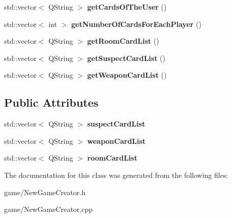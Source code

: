 \begin{DoxyCompactItemize}
\item 
\mbox{\label{classNewGameCreator_ac2905e16676010c2989674a8e18e2d9b}} 
std\+::vector$<$ Q\+String $>$ {\bfseries get\+Cards\+Of\+The\+User} ()
\item 
\mbox{\label{classNewGameCreator_a6bdc7ce36cc5c1bf2952ddd0167e6681}} 
std\+::vector$<$ int $>$ {\bfseries get\+Number\+Of\+Cards\+For\+Each\+Player} ()
\item 
\mbox{\label{classNewGameCreator_a10fb606e5d5132e63e3b81c8dc827486}} 
std\+::vector$<$ Q\+String $>$ {\bfseries get\+Room\+Card\+List} ()
\item 
\mbox{\label{classNewGameCreator_a94a0cfacc7bb3c7224de5df452528b4a}} 
std\+::vector$<$ Q\+String $>$ {\bfseries get\+Suspect\+Card\+List} ()
\item 
\mbox{\label{classNewGameCreator_ad5295b6deb4af47e067bf151654453ff}} 
std\+::vector$<$ Q\+String $>$ {\bfseries get\+Weapon\+Card\+List} ()
\end{DoxyCompactItemize}
\subsection*{Public Attributes}
\begin{DoxyCompactItemize}
\item 
\mbox{\label{classNewGameCreator_ab8658159eeea5d1a44e1b61c5f458076}} 
std\+::vector$<$ Q\+String $>$ {\bfseries suspect\+Card\+List}
\item 
\mbox{\label{classNewGameCreator_a0ec6058c643607c851736b274ef7b104}} 
std\+::vector$<$ Q\+String $>$ {\bfseries weapon\+Card\+List}
\item 
\mbox{\label{classNewGameCreator_a9c9e4a635241a52d1b65f6a9a2ef59c6}} 
std\+::vector$<$ Q\+String $>$ {\bfseries room\+Card\+List}
\end{DoxyCompactItemize}


The documentation for this class was generated from the following files\+:\begin{DoxyCompactItemize}
\item 
game/New\+Game\+Creator.\+h\item 
game/New\+Game\+Creator.\+cpp\end{DoxyCompactItemize}
